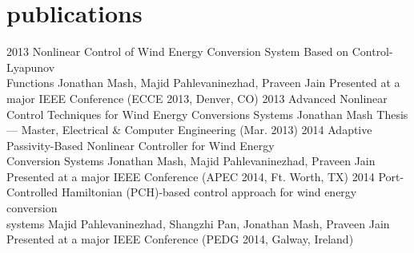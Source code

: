 \section{publications}

\begin{entrylist}
\entry
{2013}
{Nonlinear Control of Wind Energy Conversion System Based on Control-Lyapunov \\Functions}
{Jonathan Mash, Majid Pahlevaninezhad, Praveen Jain}
{Presented at a major IEEE Conference (ECCE 2013, Denver, CO)}
\entry
{2013}
{Advanced Nonlinear Control Techniques for Wind Energy Conversions Systems}
{Jonathan Mash}
{Thesis — Master, Electrical \& Computer Engineering (Mar. 2013)}
\entry
{2014}
{Adaptive Passivity-Based Nonlinear Controller for Wind Energy \\Conversion Systems}
{Jonathan Mash, Majid Pahlevaninezhad, Praveen Jain}
{Presented at a major IEEE Conference (APEC 2014, Ft. Worth, TX)}
\entry
{2014}
{Port-Controlled Hamiltonian (PCH)-based control approach for wind energy conversion \\systems}
{Majid Pahlevaninezhad, Shangzhi Pan, Jonathan Mash, Praveen Jain}
{Presented at a major IEEE Conference (PEDG 2014, Galway, Ireland)}

\end{entrylist}